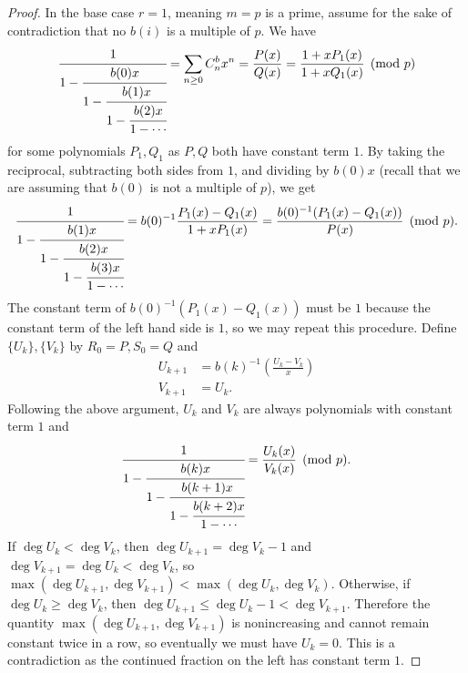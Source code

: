 \begin{proof}
    In the base case $r=1$, meaning $m=p$ is a prime, assume for the sake of contradiction that no $b(i)$ is a multiple of $p$. We have
    \[\cfrac{1}{1-\cfrac{b(0)x}{1-\cfrac{b(1)x}{1-\cfrac{b(2)x}{1-\cdots}}}}=\sum_{n\geq0}C_n^bx^n=\frac{P(x)}{Q(x)}=\frac{1+xP_1(x)}{1+xQ_1(x)}\pmod{p}\]
    for some polynomials $P_1, Q_1$ as $P, Q$ both have constant term $1$. By taking the reciprocal, subtracting both sides from $1$, and dividing by $b(0)x$ (recall that we are assuming that $b(0)$ is not a multiple of $p$), we get
    \[\cfrac{1}{1-\cfrac{b(1)x}{1-\cfrac{b(2)x}{1-\cfrac{b(3)x}{1-\cdots}}}}=b(0)^{-1}\frac{P_1(x)-Q_1(x)}{1+xP_1(x)}=\frac{b(0)^{-1}(P_1(x)-Q_1(x))}{P(x)}\pmod{p}.\]
    The constant term of $b(0)^{-1}(P_1(x)-Q_1(x))$ must be $1$ because the constant term of the left hand side is $1$, so we may repeat this procedure. Define $\{U_k\}, \{V_k\}$ by $R_0=P, S_0=Q$ and
    \begin{align*}
        U_{k+1} &= b(k)^{-1}\left(\frac{U_k-V_k}{x}\right) \\
        V_{k+1} &= U_k.
    \end{align*}
    Following the above argument, $U_k$ and $V_k$ are always polynomials with constant term $1$ and
    \[\cfrac{1}{1-\cfrac{b(k)x}{1-\cfrac{b(k+1)x}{1-\cfrac{b(k+2)x}{1-\cdots}}}}=\frac{U_k(x)}{V_k(x)}\pmod{p}.\]
    If $\deg U_k < \deg V_k$, then $\deg U_{k+1} = \deg V_k-1$ and $\deg V_{k+1} = \deg U_k < \deg V_k$, so $\max(\deg U_{k+1}, \deg V_{k+1}) < \max (\deg U_k, \deg V_k)$. Otherwise, if $\deg U_k\geq \deg V_k$, then $\deg U_{k+1}\leq \deg U_k-1 < \deg V_{k+1}$. Therefore the quantity $\max(\deg U_{k+1}, \deg V_{k+1})$ is nonincreasing and cannot remain constant twice in a row, so eventually we must have $U_k=0$. This is a contradiction as the continued fraction on the left has constant term $1$.
    

\end{proof}
